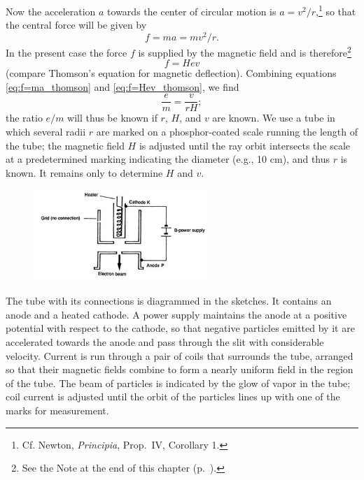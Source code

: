Now the acceleration $a$ towards the center of circular motion is
$a = v^2/r$,\footnote{Cf. Newton, \emph{Principia},
  Prop.\ IV, Corollary 1.} so that the central force will be given by
%
\begin{equation}
f = ma = mv^2/r.\label{eq:f=ma_thomson}
\end{equation}
%
In the present case the force $f$ is supplied by the magnetic field
and is therefore\footnote{See the Note at the end of this chapter (p.~\pageref{n:thomson}).}
\begin{equation}
f = Hev\label{eq:f=Hev_thomson}
\end{equation}
(compare Thomson's equation for magnetic deflection). Combining
equations \eqref{eq:f=ma_thomson} and \eqref{eq:f=Hev_thomson}, we find
\begin{equation}
\frac{e}{m} = \frac{v}{rH};\label{eq:em=vrH_thomson}
\end{equation}
the ratio $e/m$ will thus be known if $r$, $H$, and
$v$ are known. We use a tube in which several radii $r$
are marked on a phosphor-coated scale running the length of the tube; 
the magnetic field $H$ is adjusted
until the ray orbit intersects the scale at a predetermined marking indicating 
the diameter (e.g., 10 cm), and thus $r$ is
known. It remains only to determine $H$ and $v$.

\begin{figure}[h]
  \begin{center}
    \includegraphics[width=2.63in,height=1.36667in]{images/02_thomson/gun.png}
  \end{center}
\end{figure}


The tube with its connections is diagrammed in the sketches. It contains
an anode and a heated cathode. A power supply maintains the anode at a positive
potential with respect to the cathode, so that negative particles emitted
by it are accelerated towards the anode and pass through the slit with
considerable velocity. Current is run through a pair of coils that surrounds the tube, arranged so that 
their magnetic fields combine to form a nearly uniform field in the region of the tube. The beam of 
particles is indicated by the glow of vapor in the tube; coil current is adjusted until 
the orbit of the particles lines up with one of the marks for measurement.

